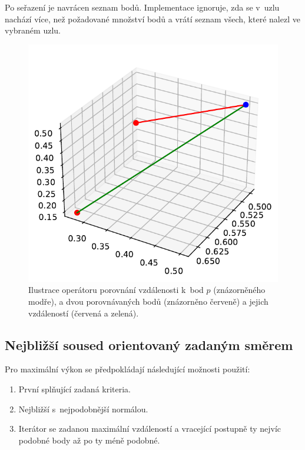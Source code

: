 Po seřazení je navrácen seznam bodů. Implementace ignoruje, zda se v~uzlu nachází více, než požadované množství bodů a vrátí seznam všech, které nalezl ve vybraném uzlu.

\begin{figure}
    \centering
    \includegraphics[scale=0.6]{obrazky-figures/hashtree/distance_operator.pdf}
    \caption{Ilustrace operátoru porovnání vzdálenosti k~bod $p$ (znázorněného modře), a dvou porovnávaných bodů (znázorněno červeně) a jejich vzdáleností (červená a zelená). 
    } 
    \label{fig:distance_operator_ilustration}
\end{figure}





\subsection*{Nejbližší soused orientovaný zadaným směrem}
Pro maximální výkon se předpokládají následující možnosti použití:
\begin{enumerate}
    \item První splňující zadaná kriteria.
    \item Nejbližší s~nejpodobnější normálou.
    \item Iterátor se zadanou maximální vzdáleností a vracející postupně ty nejvíc podobné body až po ty méně podobné.
\end{enumerate}

